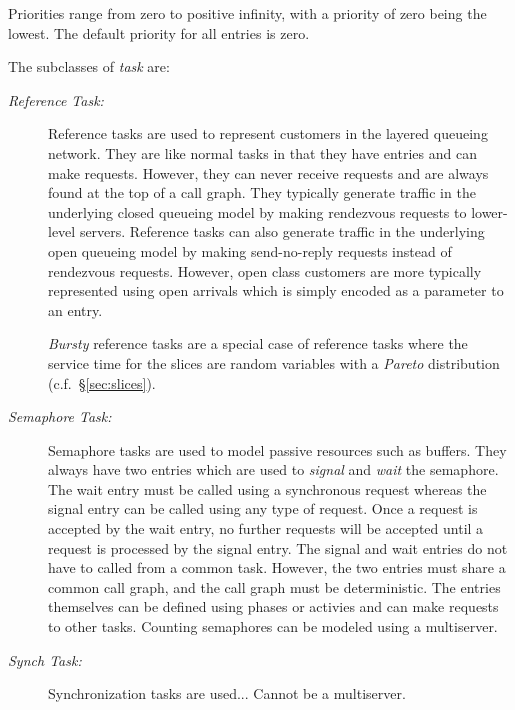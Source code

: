 Priorities range from zero to positive
infinity, with a priority of zero being the lowest.  The default
priority for all entries is zero.

The subclasses of \emph{task} are:
\begin{description}
\item[\emph{Reference Task:}] Reference tasks are used to
  represent customers in the layered queueing network.  They are like normal tasks in that
  they have entries and can make requests.  However, they can never receive requests and are always found at
  the top of a call graph.  They typically generate traffic in the underlying closed queueing
  model by making rendezvous requests to
  lower-level servers.  Reference tasks can also generate traffic in the underlying open queueing
  model by making send-no-reply requests instead of rendezvous requests.
  However, open class customers are more typically represented using open arrivals which is simply encoded
  as a parameter to an entry.
  
  \emph{Bursty} reference tasks are
  a special case of reference tasks where the service time for the slices are random variables
  with a \emph{Pareto} distribution (c.f.~\S\ref{sec:slices}).
\item[\emph{Semaphore Task:}] Semaphore tasks are used to
  model passive resources such as buffers.  They always have two entries which are
  used to \emph{signal} and \emph{wait} the
  semaphore.  The wait entry must be called using a synchronous request whereas the signal entry can be
  called using any type of request.  Once a request is accepted by the wait entry, no further requests will
  be accepted until a request is processed by the signal entry.  The signal and wait entries do not have to
  called from a common task.  However, the two entries must share a common call graph, and the call graph
  must be deterministic.  The entries themselves can be defined using phases or activies and can make
  requests to other tasks.  Counting semaphores can be modeled using a
  multiserver.
\item[\emph{Synch Task:}] Synchronization tasks
   are used...  Cannot be a multiserver.
\end{description}


